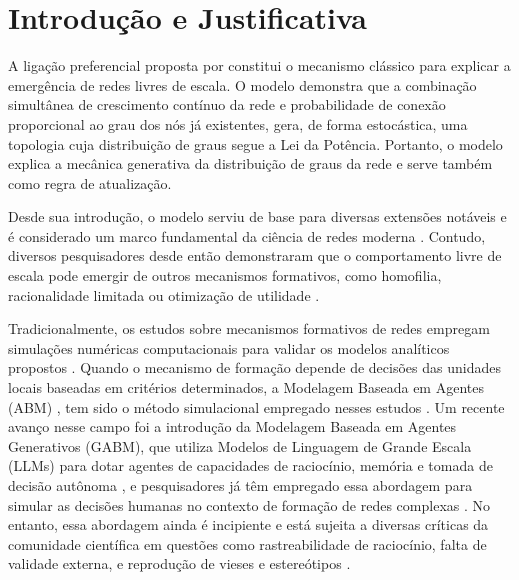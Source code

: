 \documentclass[12pt,oneside,a4paper,brazil,sumario=tradicional]{abntex2}
\begin{document}
\frenchspacing
\imprimircapa
\imprimirfolhaderosto
\tableofcontents
\clearpage
\textual
\markboth{}{}%


\section*{Introdução e Justificativa}
A ligação preferencial proposta por  constitui o mecanismo clássico para explicar a emergência de redes livres de escala. O modelo demonstra que a combinação simultânea de crescimento contínuo da rede e probabilidade de conexão proporcional ao grau dos nós já existentes, gera, de forma estocástica, uma topologia cuja distribuição de graus segue a Lei da Potência. Portanto, o modelo explica a mecânica generativa da distribuição de graus da rede e serve também como regra de atualização.

Desde sua introdução, o modelo serviu de base para diversas extensões notáveis e é considerado um marco fundamental da ciência de redes moderna \cite{latora2017, holme2019}. Contudo, diversos pesquisadores desde então demonstraram que o comportamento livre de escala pode emergir de outros mecanismos formativos, como homofilia, racionalidade limitada ou otimização de utilidade \cite{caldarelli2002, vasquez2003, ferrericancho2003, dsouza2007, serrano2008, xu2010, papadopoulos2012}.

Tradicionalmente, os estudos sobre mecanismos formativos de redes empregam simulações numéricas computacionais para validar os modelos analíticos propostos \cite{newman2003}. Quando o mecanismo de formação depende de decisões das unidades locais baseadas em critérios determinados, a Modelagem Baseada em Agentes (ABM) \cite{epstein1999, bonabeau2002}, tem sido o método simulacional empregado nesses estudos \cite{skyrms2000, tomasello2014, zhou2011, du2024}.  Um recente avanço nesse campo foi a introdução da Modelagem Baseada em Agentes Generativos (GABM), que utiliza Modelos de Linguagem de Grande Escala (LLMs) para dotar agentes de capacidades de raciocínio, memória e tomada de decisão autônoma  \cite{vezhnevets2023, ghaffarzadegan2024, lu2024}, e pesquisadores já têm empregado essa abordagem para simular as decisões humanas no contexto de formação de redes complexas \cite{demarzo2023, piao2025, papachristou2025, ji2025, ji2025b}. No entanto, essa abordagem ainda é incipiente e está sujeita a diversas críticas da comunidade científica em questões como rastreabilidade de raciocínio, falta de validade externa, e reprodução de vieses e estereótipos \cite{gao2023, piao2025, larooij2025, taillandier2026}.
\end{document}
